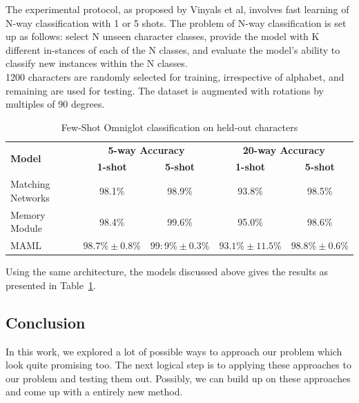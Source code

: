 The experimental protocol, as proposed by Vinyals et al\cite{DBLP:journals/corr/VinyalsBLKW16}, involves fast learning of N-way classification with 1 or 5 shots. The problem of N-way classification is set up as follows: select N unseen character classes, provide the model with K different in-stances of each of the N classes, and evaluate the model’s ability to classify new instances within the N classes.\\ 

1200 characters are randomly selected for training, irrespective of alphabet, and remaining are used for testing. The dataset is augmented with rotations by multiples of 90 degrees.\newline

\begin{table}[ht]
  \centering
  \renewcommand{\arraystretch}{1.2}
  \begin{tabular}{|p{2.5cm}|c|c|c|c|}
    \hline
    \multirow{2}{2.5cm}{\textbf{Model}} & \multicolumn{2}{c|}{\textbf{5-way Accuracy}} & \multicolumn{2}{c|}{\textbf{20-way Accuracy}} \\
    \cline{2-5}
    & \textbf{1-shot} & \textbf{5-shot} &\textbf{1-shot} & \textbf{5-shot}\\
    \hline
    Matching Networks\cite{DBLP:journals/corr/VinyalsBLKW16} &  98.1\% &  98.9\% &  93.8\% &  98.5\% \\ \hline
    Memory Module\cite{45801} & 98.4\% &  99.6\% &  95.0\% &  98.6\% \\ \hline
    MAML\cite{1703.03400} & $98.7\% \pm 0.8\%$ & $99:9\% \pm 0.3\%$ & $93.1\% \pm 11.5\%$ & $98.8\% \pm 0.6\%$ \\ \hline
  \end{tabular}
  \caption{\label{tab:results}Few-Shot Omniglot classification on held-out characters}
\end{table}

Using the same architecture, the models discussed above gives the results as presented in Table~\ref{tab:results}.

\subsection{Conclusion}
In this work, we explored a lot of possible ways to approach our problem which look quite promising too. The next logical step is to applying these approaches to our problem and testing them out. Possibly, we can build up on these approaches and come up with a entirely new method.

\pagebreak


\addtocounter{section}{1}



